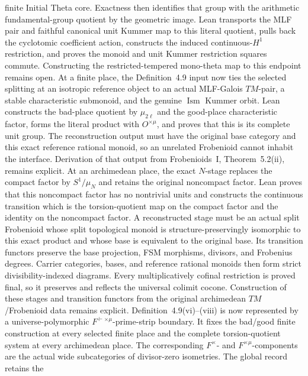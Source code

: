 \begin{definition}
  finite Initial Theta core.  Exactness then identifies that group with the
  arithmetic fundamental-group quotient by the geometric image.  Lean
  transports the MLF pair and faithful canonical unit Kummer map to this
  literal quotient, pulls back the cyclotomic coefficient action, constructs
  the induced continuous-\(H^1\) restriction, and proves the monoid and unit
  Kummer restriction squares commute.  Constructing the restricted-tempered
  mono-theta map to this endpoint remains open.
  At a finite place, the Definition~4.9 input now ties the selected splitting
  at an isotropic reference object to an actual MLF-Galois \(TM\)-pair, a
  stable characteristic submonoid, and the genuine \(\operatorname{Ism}\)
  Kummer orbit.  Lean constructs the bad-place quotient by
  \(\mu_{2\ell}\) and the good-place characteristic factor, forms the literal
  product with \(O^{\times\mu}\), and proves that this is its complete unit
  group.  The reconstruction output must have the original base category and
  this exact reference rational monoid, so an unrelated Frobenioid cannot
  inhabit the interface.  Derivation of that output from Frobenioids~I,
  Theorem~5.2(ii), remains explicit.
  At an archimedean place, the exact \(N\)-stage replaces the compact factor by
  \(S^1/\mu_N\) and retains the original noncompact factor.  Lean proves that
  this noncompact factor has no nontrivial units and constructs the continuous
  transition which is the torsion-quotient map on the compact factor and the
  identity on the noncompact factor.  A reconstructed stage must be an actual
  split Frobenioid whose split topological monoid is structure-preservingly
  isomorphic to this exact product and whose base is equivalent to the original
  base.  Its transition functors preserve the base projection, FSM morphisms,
  divisors, and Frobenius degrees.  Carrier categories, bases, and reference
  rational monoids then form strict divisibility-indexed diagrams.  Every
  multiplicatively cofinal restriction is proved final, so it preserves and reflects the universal
  colimit cocone.  Construction of these stages and transition functors from
  the original archimedean \(TM\)/Frobenioid data remains explicit.
  Definition~4.9(vi)--(viii) is now represented by a universe-polymorphic
  \(F^{\vdash\times\mu}\)-prime-strip boundary.  It fixes the bad/good
  finite construction at every selected finite place and the complete
  torsion-quotient system at every archimedean place.  The corresponding
  \(F^\times\)- and \(F^{\times\mu}\)-components are the actual wide
  subcategories of divisor-zero isometries.  The global record retains the

\end{definition}
